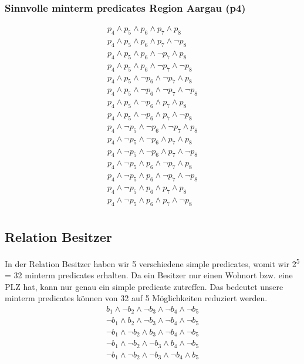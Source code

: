 \documentclass[11pt,a4paper,parskip=half]{scrartcl}
\begin{document}
\subsubsection{Sinnvolle minterm predicates Region Aargau (p4)}
\begin{align*}
p_4 \wedge p_5 \wedge p_6 \wedge p_7 \wedge p_8\\
p_4 \wedge p_5 \wedge p_6 \wedge p_7 \wedge \neg p_8\\
p_4 \wedge p_5 \wedge p_6 \wedge \neg p_7 \wedge p_8\\
p_4 \wedge p_5 \wedge p_6 \wedge \neg p_7 \wedge \neg p_8\\
p_4 \wedge p_5 \wedge \neg p_6 \wedge \neg p_7 \wedge p_8\\
p_4 \wedge p_5 \wedge \neg p_6 \wedge \neg p_7 \wedge \neg p_8\\
p_4 \wedge p_5 \wedge \neg p_6 \wedge  p_7 \wedge p_8\\
p_4 \wedge p_5 \wedge \neg p_6 \wedge  p_7 \wedge \neg p_8\\
p_4 \wedge \neg p_5 \wedge \neg p_6 \wedge \neg p_7 \wedge p_8\\
p_4 \wedge \neg p_5 \wedge \neg p_6 \wedge  p_7 \wedge p_8\\
p_4 \wedge \neg p_5 \wedge \neg p_6 \wedge  p_7 \wedge \neg p_8\\
p_4 \wedge \neg p_5 \wedge  p_6 \wedge \neg p_7 \wedge p_8\\
p_4 \wedge \neg p_5 \wedge  p_6 \wedge \neg p_7 \wedge \neg p_8\\
p_4 \wedge \neg p_5 \wedge  p_6 \wedge  p_7 \wedge  p_8\\
p_4 \wedge \neg p_5 \wedge  p_6 \wedge  p_7 \wedge \neg p_8\\
\end{align*}

\subsection{Relation Besitzer}
In der Relation Besitzer haben wir 5 verschiedene simple predicates, womit wir 2\textsuperscript{5} = 32 minterm predicates erhalten. Da ein Besitzer nur einen Wohnort bzw. eine PLZ hat, kann nur genau ein simple predicate zutreffen. Das bedeutet unsere minterm predicates können von 32 auf 5 Möglichkeiten reduziert werden.
\begin{align*}
b_1 \wedge \neg b_2 \wedge \neg b_3 \wedge \neg b_4 \wedge \neg b_5\\
\neg b_1 \wedge  b_2 \wedge \neg b_3 \wedge \neg b_4 \wedge \neg b_5\\
\neg b_1 \wedge \neg b_2 \wedge  b_3 \wedge \neg b_4 \wedge \neg b_5\\
\neg b_1 \wedge \neg  b_2 \wedge \neg b_3 \wedge  b_4 \wedge \neg b_5\\
\neg b_1 \wedge \neg b_2 \wedge \neg b_3 \wedge \neg b_4 \wedge b_5\\
\end{align*}
\end{document}
